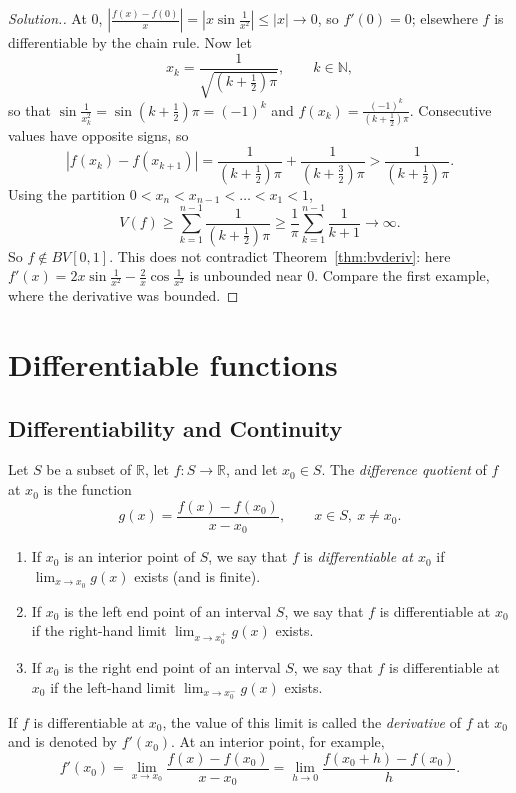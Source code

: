 \documentclass[11pt,a4paper]{article}
\numberwithin{equation}{section}
\theoremstyle{definition}
\newenvironment{solution}
  {\renewcommand{\qedsymbol}{}\begin{proof}[\textit{Solution}.]}
  {\end{proof}}
\begin{document}
\begin{solution}
At $0$, $\left|\frac{f(x)-f(0)}{x}\right| = \left|x\sin\frac{1}{x^2}\right|\leq |x|\longrightarrow 0$, so $f'(0) = 0$; elsewhere $f$ is differentiable by the chain rule. Now let
$$x_k = \frac{1}{\sqrt{\left(k+\frac{1}{2}\right)\pi}},\qquad k\in\mathbb{N},$$
so that $\sin\frac{1}{x_k^2} = \sin\left(k+\frac{1}{2}\right)\pi = (-1)^k$ and $f(x_k) = \frac{(-1)^k}{(k+\frac{1}{2})\pi}$. Consecutive values have opposite signs, so
$$|f(x_k) - f(x_{k+1})| = \frac{1}{(k+\frac{1}{2})\pi} + \frac{1}{(k+\frac{3}{2})\pi} > \frac{1}{(k+\frac{1}{2})\pi}.$$
Using the partition $0 < x_n < x_{n-1}<\dots<x_1 < 1$,
$$V(f) \geq \sum_{k=1}^{n-1} \frac{1}{(k+\frac{1}{2})\pi} \geq \frac{1}{\pi}\sum_{k=1}^{n-1}\frac{1}{k+1}\longrightarrow \infty .$$
So $f\notin BV[0,1]$. This does not contradict Theorem~\ref{thm:bvderiv}: here $f'(x) = 2x\sin\frac{1}{x^2} - \frac{2}{x}\cos\frac{1}{x^2}$ is unbounded near $0$. Compare the first example, where the derivative was bounded.
\end{solution}



\section{Differentiable functions}


\subsection{Differentiability and Continuity}

Let $S$ be a subset of $\mathbb{R}$, let $f: S\longrightarrow \mathbb{R}$, and let $x_0 \in S$. The \emph{difference quotient} of $f$ at $x_0$ is the function
$$g(x) = \frac{f(x) - f(x_0)}{x - x_0}, \qquad x\in S,\ x\neq x_0 .$$
\begin{enumerate}
\item[(a)] If $x_0$ is an interior point of $S$, we say that $f$ is \emph{differentiable at $x_0$} if $\lim_{x\rightarrow x_0} g(x)$ exists (and is finite).
\item[(b)] If $x_0$ is the left end point of an interval $S$, we say that $f$ is differentiable at $x_0$ if the right-hand limit $\lim_{x\rightarrow x_0^+} g(x)$ exists.
\item[(c)] If $x_0$ is the right end point of an interval $S$, we say that $f$ is differentiable at $x_0$ if the left-hand limit $\lim_{x\rightarrow x_0^-} g(x)$ exists.
\end{enumerate}
If $f$ is differentiable at $x_0$, the value of this limit is called the \emph{derivative} of $f$ at $x_0$ and is denoted by $f'(x_0)$. At an interior point, for example,
$$f'(x_0) = \lim_{x\rightarrow x_0} \frac{f(x) - f(x_0)}{x - x_0} = \lim_{h\rightarrow 0} \frac{f(x_0 + h) - f(x_0)}{h} .$$
\end{document}
